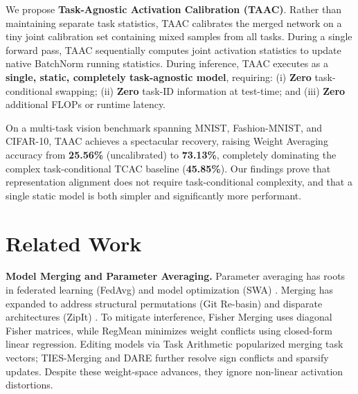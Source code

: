 \documentclass{article}
\theoremstyle{plain}
\theoremstyle{definition}
\theoremstyle{remark}
\begin{document}
We propose \textbf{Task-Agnostic Activation Calibration (TAAC)}. Rather than maintaining separate task statistics, TAAC calibrates the merged network on a tiny joint calibration set containing mixed samples from all tasks. During a single forward pass, TAAC sequentially computes joint activation statistics to update native BatchNorm running statistics. During inference, TAAC executes as a \textbf{single, static, completely task-agnostic model}, requiring: (i) \textbf{Zero} task-conditional swapping; (ii) \textbf{Zero} task-ID information at test-time; and (iii) \textbf{Zero} additional FLOPs or runtime latency.

On a multi-task vision benchmark spanning MNIST, Fashion-MNIST, and CIFAR-10, TAAC achieves a spectacular recovery, raising Weight Averaging accuracy from \textbf{25.56\%} (uncalibrated) to \textbf{73.13\%}, completely dominating the complex task-conditional TCAC baseline (\textbf{45.85\%}). Our findings prove that representation alignment does not require task-conditional complexity, and that a single static model is both simpler and significantly more performant.

\section{Related Work}
\label{submission-related-work}
\textbf{Model Merging and Parameter Averaging.} Parameter averaging has roots in federated learning (FedAvg) \cite{mcmahan2017fedavg} and model optimization (SWA) \cite{izmailov2018swa}. Merging has expanded to address structural permutations (Git Re-basin) \cite{ainsworth2022gitrebasin} and disparate architectures (ZipIt) \cite{stoica2023zipit}. To mitigate interference, Fisher Merging \cite{matena2022fisher} uses diagonal Fisher matrices, while RegMean \cite{jin2022regmean} minimizes weight conflicts using closed-form linear regression. Editing models via Task Arithmetic \cite{ilharco2022taskarithmetic} popularized merging task vectors; TIES-Merging \cite{yadav2023ties} and DARE \cite{yu2024dare} further resolve sign conflicts and sparsify updates. Despite these weight-space advances, they ignore non-linear activation distortions.
\end{document}
